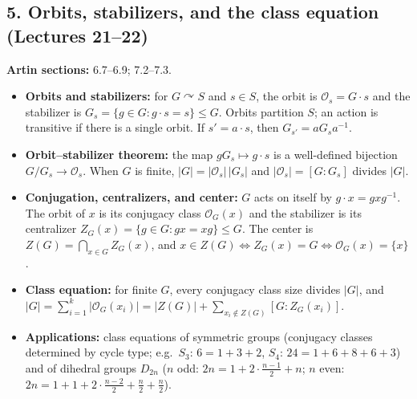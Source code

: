 \documentclass[11pt,reqno]{amsart}
\begin{document}
\subsection*{5. Orbits, stabilizers, and the class equation (Lectures 21--22)}
\noindent\textbf{Artin sections:} 6.7--6.9; 7.2--7.3.\par
\begin{itemize}
\item \textbf{Orbits and stabilizers:} for $G\curvearrowright S$ and $s\in S$, the
orbit is $\mathcal O_s=G\cdot s$ and the stabilizer is
$G_s=\{g\in G:g\cdot s=s\}\leq G$. Orbits partition $S$; an action is transitive if
there is a single orbit. If $s'=a\cdot s$, then $G_{s'}=aG_sa^{-1}$.
\item \textbf{Orbit--stabilizer theorem:} the map $gG_s\mapsto g\cdot s$ is a
well-defined bijection $G/G_s\to\mathcal O_s$. When $G$ is finite,
$|G|=|\mathcal O_s|\,|G_s|$ and $|\mathcal O_s|=[G:G_s]$ divides $|G|$.
\item \textbf{Conjugation, centralizers, and center:} $G$ acts on itself by
$g\cdot x=gxg^{-1}$. The orbit of $x$ is its conjugacy class $\mathcal{O}_G(x)$ and the
stabilizer is its centralizer $Z_G(x)=\{g\in G:gx=xg\}\leq G$. The center is
$Z(G)=\bigcap_{x\in G}Z_G(x)$, and $x\in Z(G)\iff Z_G(x)=G\iff\mathcal{O}_G(x)=\{x\}$.
\item \textbf{Class equation:} for finite $G$, every conjugacy class size divides $|G|$, and
$|G|=\sum_{i=1}^k|\mathcal{O}_G(x_i)|=|Z(G)|+\sum_{x_i\notin Z(G)}[G:Z_G(x_i)]$.
\item \textbf{Applications:} class equations of symmetric groups (conjugacy classes
determined by cycle type; e.g.\ $S_3$: $6=1+3+2$, $S_4$: $24=1+6+8+6+3$) and of
dihedral groups $D_{2n}$ ($n$ odd: $2n=1+2\cdot\tfrac{n-1}{2}+n$; $n$ even:
$2n=1+1+2\cdot\tfrac{n-2}{2}+\tfrac n2+\tfrac n2$).
\end{itemize}
\end{document}
